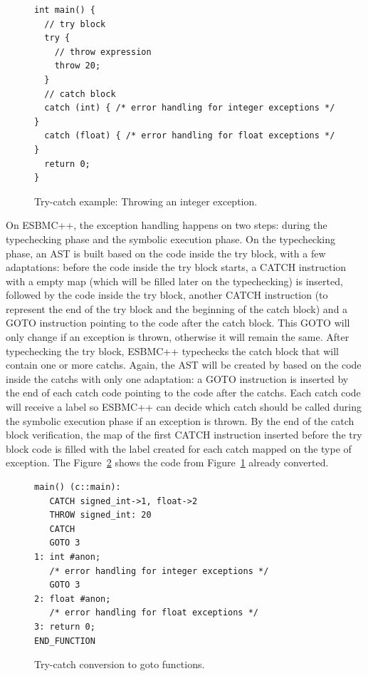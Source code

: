 \documentclass[a4paper]{llncs}
\begin{document}
\begin{figure}[ht]
\centering
\begin{minipage}{1.0\textwidth}
\begin{lstlisting}
int main() {
  // try block
  try {
    // throw expression
    throw 20; 
  }
  // catch block
  catch (int) { /* error handling for integer exceptions */ }
  catch (float) { /* error handling for float exceptions */ }
  return 0;
}
\end{lstlisting}
\end{minipage}
\caption{Try-catch example: Throwing an integer exception.}
\label{figure:try-catch-example}
\end{figure}

On ESBMC++, the exception handling happens on two steps: 
during the typechecking phase and the symbolic execution phase. 
On the typechecking phase, an AST is built based on the code 
inside the try block, with a few adaptations: before the code 
inside the try block starts, a CATCH instruction with a empty map 
(which will be filled later on the typechecking) is inserted, followed by
the code inside the try block, another CATCH instruction 
(to represent the end of the try block and the beginning of the 
catch block) and a GOTO instruction pointing to the code after 
the catch block. This GOTO will only change if an exception is thrown, 
otherwise it will remain the same. After typechecking the try block, 
ESBMC++ typechecks the catch block that will contain one or more catchs. 
Again, the AST will be created by based on the code inside the catchs 
with only one adaptation: a GOTO instruction is inserted by the end of 
each catch code pointing to the code after the catchs. Each catch code 
will receive a label so ESBMC++ can decide which catch should be called 
during the symbolic execution phase if an exception is thrown. By the end 
of the catch block verification, the map of the first CATCH instruction 
inserted before the try block code is filled with the label created 
for each catch mapped on the type of exception. The Figure~\ref{figure:try-catch-goto} 
shows the code from Figure~\ref{figure:try-catch-example} already converted.

\begin{figure}[ht]
\centering
\begin{minipage}{1.0\textwidth}
\begin{lstlisting}
main() (c::main):
   CATCH signed_int->1, float->2  
   THROW signed_int: 20
   CATCH 
   GOTO 3
1: int #anon;
   /* error handling for integer exceptions */
   GOTO 3
2: float #anon;
   /* error handling for float exceptions */
3: return 0;
END_FUNCTION
\end{lstlisting}
\end{minipage}
\caption{Try-catch conversion to goto functions.}
\label{figure:try-catch-goto}
\end{figure}
\end{document}

